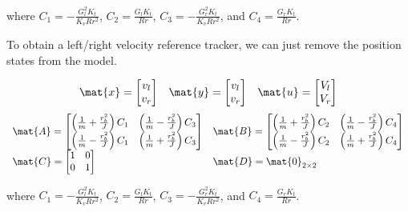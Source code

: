 where $C_1 = -\frac{G_l^2 K_t}{K_v R r^2}$, $C_2 = \frac{G_l K_t}{Rr}$,
$C_3 = -\frac{G_r^2 K_t}{K_v R r^2}$, and $C_4 = \frac{G_r K_t}{Rr}$.

To obtain a left/right velocity \gls{reference} tracker, we can just remove the
position \glspl{state} from the \gls{model}.
\begin{theorem}
  \label{thm:ramsete_decoupled_ref_tracker}
  \begin{equation*}
    \begin{array}{ccc}
      \mat{x} =
      \begin{bmatrix}
        v_l \\
        v_r
      \end{bmatrix} &
      \mat{y} =
      \begin{bmatrix}
        v_l \\
        v_r
      \end{bmatrix} &
      \mat{u} =
      \begin{bmatrix}
        V_l \\
        V_r
      \end{bmatrix}
    \end{array}
  \end{equation*}
  \begin{equation}
    \begin{array}{ll}
      \mat{A} =
      \begin{bmatrix}
        \left(\frac{1}{m} + \frac{r_b^2}{J}\right) C_1 &
          \left(\frac{1}{m} - \frac{r_b^2}{J}\right) C_3 \\
        \left(\frac{1}{m} - \frac{r_b^2}{J}\right) C_1 &
          \left(\frac{1}{m} + \frac{r_b^2}{J}\right) C_3
      \end{bmatrix} &
      \mat{B} =
      \begin{bmatrix}
        \left(\frac{1}{m} + \frac{r_b^2}{J}\right) C_2 &
          \left(\frac{1}{m} - \frac{r_b^2}{J}\right) C_4 \\
        \left(\frac{1}{m} - \frac{r_b^2}{J}\right) C_2 &
          \left(\frac{1}{m} + \frac{r_b^2}{J}\right) C_4
      \end{bmatrix} \\
      \mat{C} =
      \begin{bmatrix}
        1 & 0 \\
        0 & 1 \\
      \end{bmatrix} &
      \mat{D} = \mat{0}_{2 \times 2}
    \end{array}
  \end{equation}

  where $C_1 = -\frac{G_l^2 K_t}{K_v R r^2}$, $C_2 = \frac{G_l K_t}{Rr}$,
  $C_3 = -\frac{G_r^2 K_t}{K_v R r^2}$, and $C_4 = \frac{G_r K_t}{Rr}$.
\end{theorem}

